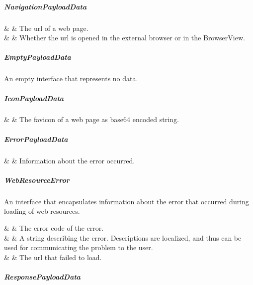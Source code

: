 \subparagraph{NavigationPayloadData}

\begin{interfacedesc}
          &   & The \ac{url} of a web page. \\ \hline
   &  & Whether the \ac{url} is opened in the external browser or in the BrowserView. \\ \hline
\end{interfacedesc}

\subparagraph{EmptyPayloadData}

An empty interface that represents no data.


\subparagraph{IconPayloadData}

\begin{interfacedesc}
   &  & The favicon of a web page as base64 encoded string. \\ \hline
\end{interfacedesc}

\subparagraph{ErrorPayloadData}

\begin{interfacedesc}
   &  & Information about the error occurred. \\ \hline
\end{interfacedesc}

\subparagraph{WebResourceError}

An interface that encapsulates information about the error that occurred during loading of web resources.

\begin{interfacedesc}
          &  & The error code of the error. \\ \hline
   &  & A string describing the error. Descriptions are localized, and thus can be used for communicating the problem to the user. \\ \hline
       &  & The \ac{url} that failed to load. \\ \hline
\end{interfacedesc}

\subparagraph{ResponsePayloadData}

